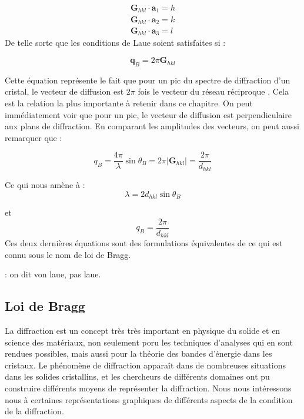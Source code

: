 \begin{eqnarray}
    \mathbf{G}_{hkl} \cdot \mathbf{a}_1 = h \\
    \mathbf{G}_{hkl} \cdot \mathbf{a}_2 = k \\
    \mathbf{G}_{hkl} \cdot \mathbf{a}_3 = l
\end{eqnarray}
De telle sorte que les conditions de Laue soient satisfaites si :

\begin{equation}
    \mathbf{q}_B = 2\pi \mathbf{G}_{hkl}
\end{equation}

Cette équation représente le fait que pour un pic du spectre de diffraction d'un
cristal, le vecteur de diffusion est $2 \pi$ fois le vecteur du réseau réciproque
. Cela est la relation la plus importante à retenir dans ce chapitre. On peut
immédiatement voir que pour un pic, le vecteur de diffusion est perpendiculaire
aux plans de diffraction. En comparant les amplitudes des vecteurs, on peut aussi
remarquer que :

\begin{equation}
    q_B = \frac{4\pi}{\lambda} \sin \theta_B = 2\pi |\mathbf{G}_{hkl} | = \frac{2\pi}{d_{hkl}}
\end{equation}

Ce qui nous amène à :
\begin{equation}
    \lambda = 2 d_{hkl} \sin \theta_B
\end{equation}

et
\begin{equation}
    q_B = \frac{2\pi}{d_{hkl}}
\end{equation}
Ces deux dernières équations sont des formulations équivalentes de ce qui est
connu sous le nom de loi de Bragg.

\TODO: on dit von laue, pas laue.

\subsection{Loi de Bragg}

La diffraction est un concept très très important en physique du solide et en
science des matériaux, non seulement poru les techniques d'analyses qui en sont
rendues possibles, mais aussi pour la théorie des bandes d'énergie dans les
cristaux. Le phénomène de diffraction apparaît dans de nombreuses situations dans
les solides cristallins, et les chercheurs de différents domaines ont pu
construire différents moyens de représenter la diffraction. Nous nous intéressons
nous à certaines représentations graphiques de différents aspects de la
condition de la diffraction.

